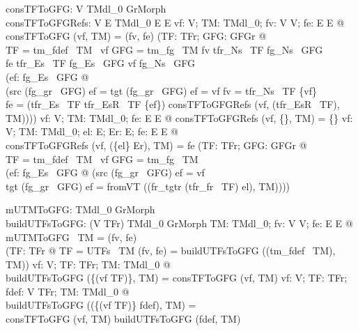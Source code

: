 \begin{axdef}
  consTFToGFG: V \cross  TMdl_0{} \fun  GrMorph\\
  consTFToGFGRefs: V \cross  \power  E \cross  TMdl_0{} \fun  E \pfun  E
\where
  \forall  vf: V; TM: TMdl_0{}; fv: V \pfun  V; fe: E \pfun  E @ \\ \quad 
  consTFToGFG (vf, TM) = (fv, fe) \iff  (\exists  TF: TFr; GFG: GFGr @ \\ \qquad
  	TF = tm\_fdef~ TM~ vf \land  GFG = tm\_fg~ TM \land  fv \in  tfr\_Ns~ TF \fun  fg\_Ns~ GFG \\ \qquad
	\land  fe \in  tfr\_Es~ TF \fun  fg\_Es~ GFG \land  vf \in  fg\_Ns~ GFG \\ \qquad  
	\land  (\exists  ef: fg\_Es~ GFG @ \\ \qquad  \quad 
		(src (fg\_gr~ GFG) ef = tgt (fg\_gr~ GFG) ef = vf \land  fv = tfr\_Ns~ TF \cross  \{vf\} \\ \qquad \quad 
	\land  fe = (tfr\_Es~ TF \setminus  tfr\_EsR~ TF \cross  \{ef\}) \cup  consTFToGFGRefs (vf, (tfr\_EsR~ TF), TM))))
\also
  \forall  vf: V; TM: TMdl_0; fe: E \pfun  E @ consTFToGFGRefs (vf, \{\}, TM) = \{\}
\also
  \forall  vf: V; TM: TMdl_0; el: E; Er: \power  E; fe: E \pfun  E @ \\ \quad
  	consTFToGFGRefs (vf, (\{el\} \cup  Er), TM) = fe \iff  (\exists  TF: TFr; GFG: GFGr @ \\ \quad
		TF = tm\_fdef~ TM~ vf \land  GFG = tm\_fg~ TM \\ \quad 
		\land  (\exists  ef: fg\_Es~ GFG @ (src (fg\_gr~ GFG) ef = vf \\ \quad 
		\land  tgt (fg\_gr~ GFG) ef = fromVT ((fr\_tgtr (tfr\_fr~ TF) el), TM))))
\end{axdef}

\begin{axdef}
  mUTMToGFG: TMdl_0 \fun  GrMorph\\
  buildUTFsToGFG: (V \pfun  TFr) \cross  TMdl_0 \fun  GrMorph
\where
  \forall  TM: TMdl_0; fv: V \pfun  V; fe: E \pfun  E @ \\ \quad 
  mUTMToGFG~ TM = (fv, fe) \iff \\ \qquad
   (\exists  TF: TFr @ TF = UTFs~ TM \land  (fv, fe) = buildUTFsToGFG ((tm\_fdef~ TM), TM))
 \also
  \forall  vf: V; TF: TFr; TM: TMdl_0 @ \\ \quad  
  	buildUTFsToGFG (\{(vf \mapsto  TF)\}, TM) = consTFToGFG (vf, TM)
 \also
  \forall  vf: V; TF: TFr; fdef: V \pfun  TFr; TM: TMdl_0 @ \\ \quad 
   buildUTFsToGFG ((\{(vf \mapsto  TF)\} \cup  fdef), TM) = \\ \qquad 
   	consTFToGFG (vf, TM) \UGM buildUTFsToGFG (fdef, TM)
\end{axdef}


